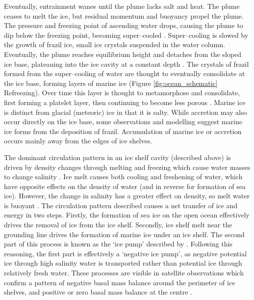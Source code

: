 Eventually, entrainment wanes until the plume lacks salt and heat. The plume ceases to melt the ice, but residual momentum and buoyancy propel the plume. The pressure and freezing point of ascending water drops, causing the plume to dip below the freezing point, becoming super--cooled \citep{holland2006effects}.  Super--cooling is slowed by the growth of frazil ice, small ice crystals suspended in the water column. Eventually, the plume reaches equilibrium height and detaches from the sloped ice base, plateauing into the ice cavity at a constant depth  \citep{hewitt2020subglacial}. 
The crystals of frazil formed from the super--cooling of water are thought to eventually consolidate at the ice base, forming layers of marine ice \cite[e.g.][]{fricker2001distribution} (Figure {\ref{fig:ocean_schematic}
} Refreezing).  Over time this layer is thought to metamorphose and consolidate, first forming  a platelet layer, then continuing to become less porous \citep{craven2009properties}. Marine ice is distinct from glacial (meteoric) ice in that it is salty. While accretion may also occur directly on the ice base, some observations \citep{vavnkova2021nature} and modelling \citep{bombosch1995modeling} suggest marine ice forms from the deposition of frazil.  Accumulation of marine ice or accretion occurs mainly away from the edges of ice shelves. 

The dominant circulation pattern in an ice shelf cavity (described above) is driven by density changes through melting and freezing which cause water masses to change salinity \citep{jacobs1992melting}. Ice melt causes both cooling and freshening of water, which have opposite effects on the density of water (and in reverse for formation of sea ice). However, the change in salinity has a greater effect on density, so melt water is buoyant \citep{jenkins1991one}. The circulation pattern described causes a net transfer of ice and energy in two steps. Firstly, the formation of sea ice on the open ocean effectively drives the removal of ice from the ice shelf. Secondly, ice shelf melt near the grounding line drives the formation of marine ice under an ice shelf.
The second part of this process is known as the `ice pump' described by \cite{lewis1986ice}. Following this reasoning, the first part is effectively a `negative ice pump', as negative potential ice through high salinity water is transported rather than potential ice through relatively fresh water.
These processes are visible in satellite observations which confirm a pattern of negative basal mass balance around the perimeter of ice shelves, and positive or zero basal mass balance at the centre \citep[e.g.][]{rignot2013ice}. 



